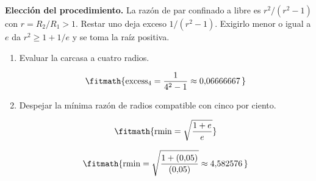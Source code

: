 \noindent\textbf{Elección del procedimiento.} La razón de par confinado a libre es $r^2/(r^2-1)$ con $r=R_2/R_1>1$. Restar uno deja exceso $1/(r^2-1)$. Exigirlo menor o igual a $e$ da $r^2\ge1+1/e$ y se toma la raíz positiva.

\begin{enumerate}

\item Evaluar la carcasa a cuatro radios.

\[\fitmath{\mathrm{excess}_{4}=\frac{1}{{4}^{2}-1}\approx 0{,}06666667\,}\]

\item Despejar la mínima razón de radios compatible con cinco por ciento.

\[\fitmath{\mathrm{rmin}=\sqrt{\frac{1+e}{e}}}\]

\[\fitmath{\mathrm{rmin}=\sqrt{\frac{1+(0{,}05)}{(0{,}05)}}\approx 4{,}582576\,}\]

\end{enumerate}
